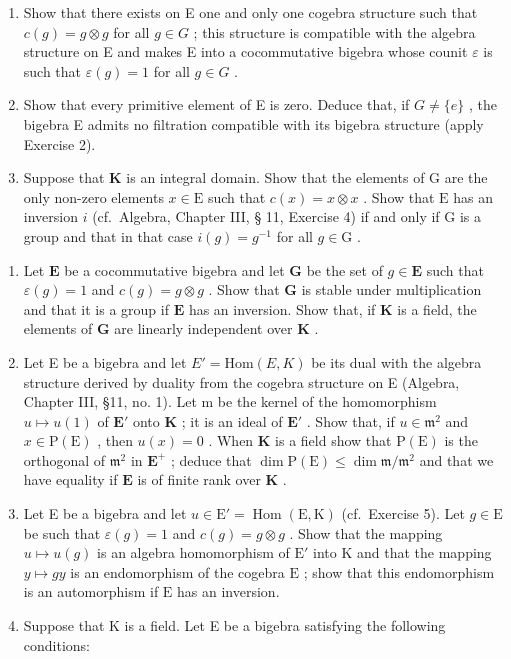 \begin{enumerate}
\def\labelenumi{(\alph{enumi})}
\item
  Show that there exists on E one and only one cogebra structure such that \(c(g) = g \otimes g\) for all \(g \in G\) ; this structure is compatible with the algebra structure on E and makes E into a cocommutative bigebra whose counit \(\varepsilon\) is such that \(\varepsilon(g) = 1\) for all \(g \in G\) .
\item
  Show that every primitive element of E is zero. Deduce that, if \(G \neq \{e\}\) , the bigebra E admits no filtration compatible with its bigebra structure (apply Exercise 2).
\item
  Suppose that \(\mathbf{K}\) is an integral domain. Show that the elements of \(\mathrm{G}\) are the only non-zero elements \(x\in \mathrm{E}\) such that \(c(x) = x\otimes x\) . Show that \(\mathrm{E}\) has an inversion \(i\) (cf.~Algebra, Chapter III, § 11, Exercise 4) if and only if \(\mathrm{G}\) is a group and that in that case \(i(g) = g^{-1}\) for all \(g\in \mathrm{G}\) .
\end{enumerate}

\begin{enumerate}
\def\labelenumi{\arabic{enumi}.}
\setcounter{enumi}{3}
\item
  Let \(\mathbf{E}\) be a cocommutative bigebra and let \(\mathbf{G}\) be the set of \(g \in \mathbf{E}\) such that \(\varepsilon(g) = 1\) and \(c(g) = g \otimes g\) . Show that \(\mathbf{G}\) is stable under multiplication and that it is a group if \(\mathbf{E}\) has an inversion. Show that, if \(\mathbf{K}\) is a field, the elements of \(\mathbf{G}\) are linearly independent over \(\mathbf{K}\) .
\item
  Let E be a bigebra and let \(E' = \text{Hom}(E, K)\) be its dual with the algebra structure derived by duality from the cogebra structure on E (Algebra, Chapter III, §11, no. 1). Let m be the kernel of the homomorphism \(u \mapsto u(1)\) of \(\mathbf{E}'\) onto \(\mathbf{K}\) ; it is an ideal of \(\mathbf{E}'\) . Show that, if \(u \in \mathfrak{m}^2\) and \(x \in \mathrm{P}(\mathrm{E})\) , then \(u(x) = 0\) . When \(\mathbf{K}\) is a field show that \(\mathrm{P}(\mathrm{E})\) is the orthogonal of \(\mathfrak{m}^2\) in \(\mathbf{E}^+\) ; deduce that \(\dim \mathrm{P}(\mathrm{E}) \leqslant \dim \mathfrak{m} / \mathfrak{m}^2\) and that we have equality if \(\mathbf{E}\) is of finite rank over \(\mathbf{K}\) .
\item
  Let E be a bigebra and let \(u \in \mathrm{E}' = \operatorname{Hom}(\mathrm{E}, \mathrm{K})\) (cf.~Exercise 5). Let \(g \in \mathrm{E}\) be such that \(\varepsilon(g) = 1\) and \(c(g) = g \otimes g\) . Show that the mapping \(u \mapsto u(g)\) is an algebra homomorphism of \(\mathrm{E}'\) into \(\mathrm{K}\) and that the mapping \(y \mapsto gy\) is an endomorphism of the cogebra \(\mathrm{E}\) ; show that this endomorphism is an automorphism if \(\mathrm{E}\) has an inversion.
\item
  Suppose that K is a field. Let E be a bigebra satisfying the following conditions:
\end{enumerate}

